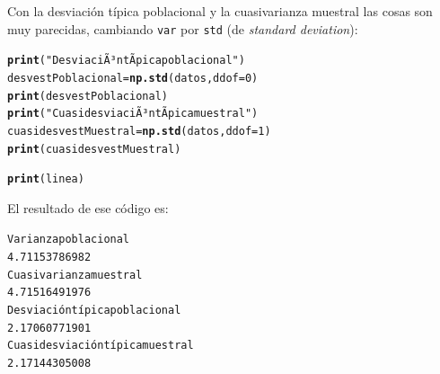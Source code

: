 \documentclass[10pt,a4paper]{article}\usepackage[]{graphicx}\usepackage[]{color}
\makeatletter
\newcommand{\hlnum}[1]{\textcolor[rgb]{0.686,0.059,0.569}{#1}}%
\newcommand{\hlstr}[1]{\textcolor[rgb]{0.192,0.494,0.8}{#1}}%
\newcommand{\hlstd}[1]{\textcolor[rgb]{0.345,0.345,0.345}{#1}}%
\newcommand{\hlkwb}[1]{\textcolor[rgb]{0.69,0.353,0.396}{#1}}%
\newcommand{\hlkwc}[1]{\textcolor[rgb]{0.333,0.667,0.333}{#1}}%
\newcommand{\hlkwd}[1]{\textcolor[rgb]{0.737,0.353,0.396}{\textbf{#1}}}%
\newenvironment{kframe}{%
 \def\at@end@of@kframe{}%
 \ifinner\ifhmode%
  \def\at@end@of@kframe{\end{minipage}}%
  \begin{minipage}{\columnwidth}%
 \fi\fi%
 \def\FrameCommand##1{\hskip\@totalleftmargin \hskip-\fboxsep
 \colorbox{shadecolor}{##1}\hskip-\fboxsep
     \hskip-\linewidth \hskip-\@totalleftmargin \hskip\columnwidth}%
 \MakeFramed {\advance\hsize-\width
   \@totalleftmargin\z@ \linewidth\hsize
   \@setminipage}}%
 {\par\unskip\endMakeFramed%
 \at@end@of@kframe}
\newenvironment{knitrout}{}{} %
\makeatother
\begin{document}
Con la desviación típica poblacional y la cuasivarianza muestral las cosas son muy parecidas, cambiando {\tt var} por {\tt std} (de {\em standard deviation}):
\begin{knitrout}
\color{fgcolor}\begin{kframe}
\begin{alltt}
\hlkwd{print}\hlstd{(}\hlstr{"DesviaciÃ³n tÃ­pica poblacional"}\hlstd{)}
\hlstd{desvestPoblacional} \hlkwb{=} \hlkwd{np.std}\hlstd{(datos,} \hlkwc{ddof}\hlstd{=}\hlnum{0}\hlstd{)}
\hlkwd{print}\hlstd{(desvestPoblacional)}
\hlkwd{print}\hlstd{(}\hlstr{"CuasidesviaciÃ³n tÃ­pica muestral"}\hlstd{)}
\hlstd{cuasidesvestMuestral} \hlkwb{=} \hlkwd{np.std}\hlstd{(datos,} \hlkwc{ddof}\hlstd{=}\hlnum{1}\hlstd{)}
\hlkwd{print}\hlstd{(cuasidesvestMuestral)}

\hlkwd{print}\hlstd{(linea)}
\end{alltt}
\end{kframe}
\end{knitrout}
El resultado de ese código es:
\begin{knitrout}
\color{fgcolor}\begin{kframe}
\begin{alltt}
Varianza poblacional
4.71153786982
Cuasivarianza muestral
4.71516491976
Desviación típica poblacional
2.17060771901
Cuasidesviación típica muestral
2.17144305008
\end{alltt}
\end{kframe}
\end{knitrout}
\end{document}
